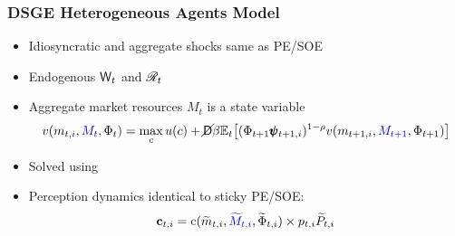 \documentclass{beamer}\usepackage{dcolumn}
\newcommand{\jemph}[1]{{\color{StataDarkBlue}#1}}
\providecommand{\perc}[1]{\widetilde{#1}}
\providecommand{\jemph}[1]{{\color{jirkasblue}#1}}
\begin{document}
\begin{frame}
\frametitle{DSGE Heterogeneous Agents Model}

\begin{itemize}
\item  Idiosyncratic and aggregate shocks same as PE/SOE
\item  Endogenous $\mathsf{W}_t$ and $\mathscr{R}_t$
\item Aggregate market resources $M_t$ is a state variable
\small
\begin{equation*}
 v(m_{t,i},\jemph{M_t},\PtyGro_t) = \max_{\cRat} \util(\cRat) + \PLives\DiscFac \Ex_{t}\big[(\Phi_{t+1}\pmb{\pShk}_{t+1,i})^{1-\CRRA}v(m_{t+1,i},\jemph{M_{t+1}},\PtyGro_{t+1})\big]
\end{equation*}
\normalsize
\item Solved using \cite{ksHetero}
\item  Perception dynamics identical to sticky PE/SOE:
$$\cLevBF_{t,i} = \cFunc(\perc{m}_{t,i},\jemph{\perc{M}_{t,i}},\perc{\PtyGro}_{t,i})\times{p}_{t,i}\perc{P}_{t,i}$$
\end{itemize}
\end{frame}
\end{document}
